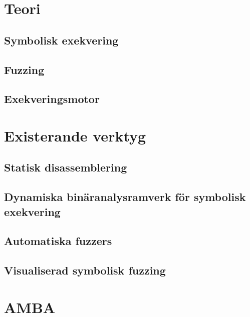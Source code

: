 \documentclass[12pt,a4paper,twoside,openright]{report}
\begin{document}
\chapter{Teori}\label{chap:teori}

\section{Symbolisk exekvering}\label{sec:symbolic_execution}

\section{Fuzzing}

\section{Exekveringsmotor}


\chapter{Existerande verktyg}\label{chap:existerande_verktyg}

\section{Statisk disassemblering}\label{sec:existerande-disasm}

\section{Dynamiska binäranalysramverk för symbolisk exekvering}\label{sec:existerande-ramverk}

\section{Automatiska fuzzers}\label{sec:existerande-automatisk}

\section{Visualiserad symbolisk fuzzing}\label{sec:existerande-visualiserad}


\chapter{AMBA}\label{chap:amba}

\end{document}
